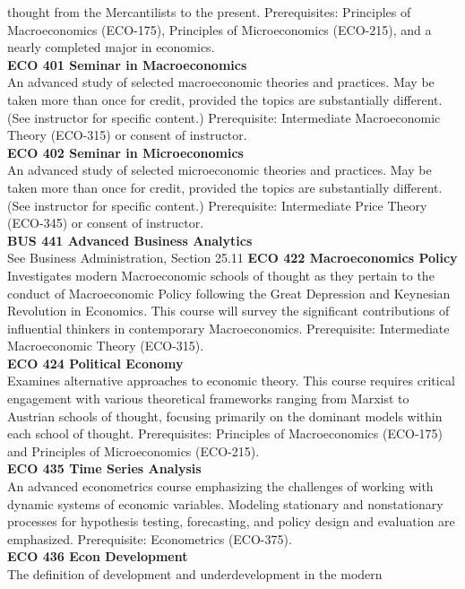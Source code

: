\documentclass[
  letterpaper,
]{scrbook}
\begin{document}
thought from the Mercantilists to the present. Prerequisites: Principles
of Macroeconomics (ECO-175), Principles of Microeconomics (ECO-215), and
a nearly completed major in economics.\\
\textbf{ECO 401 Seminar in Macroeconomics}\\
An advanced study of selected macroeconomic theories and practices. May
be taken more than once for credit, provided the topics are
substantially different. (See instructor for specific content.)
Prerequisite: Intermediate Macroeconomic Theory (ECO-315) or consent of
instructor.\\
\textbf{ECO 402 Seminar in Microeconomics}\\
An advanced study of selected microeconomic theories and practices. May
be taken more than once for credit, provided the topics are
substantially different. (See instructor for specific content.)
Prerequisite: Intermediate Price Theory (ECO-345) or consent of
instructor.\\
\textbf{BUS 441 Advanced Business Analytics}\\
See Business Administration, Section 25.11 \textbf{ECO 422
Macroeconomics Policy}\\
Investigates modern Macroeconomic schools of thought as they pertain to
the conduct of Macroeconomic Policy following the Great Depression and
Keynesian Revolution in Economics. This course will survey the
significant contributions of influential thinkers in contemporary
Macroeconomics. Prerequisite: Intermediate Macroeconomic Theory
(ECO-315).\\
\textbf{ECO 424 Political Economy}\\
Examines alternative approaches to economic theory. This course requires
critical engagement with various theoretical frameworks ranging from
Marxist to Austrian schools of thought, focusing primarily on the
dominant models within each school of thought. Prerequisites: Principles
of Macroeconomics (ECO-175) and Principles of Microeconomics
(ECO-215).\\
\textbf{ECO 435 Time Series Analysis}\\
An advanced econometrics course emphasizing the challenges of working
with dynamic systems of economic variables. Modeling stationary and
nonstationary processes for hypothesis testing, forecasting, and policy
design and evaluation are emphasized. Prerequisite: Econometrics
(ECO-375).\\
\textbf{ECO 436 Econ Development}\\
The definition of development and underdevelopment in the modern
\end{document}
